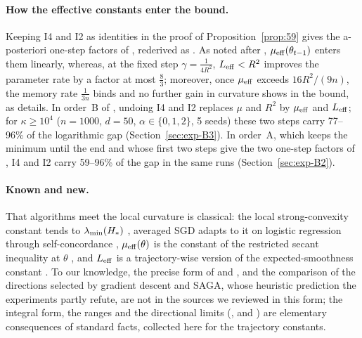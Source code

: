 \paragraph{How the effective constants enter the bound.}
Keeping I4 and I2 as identities in the proof of Proposition~\ref{prop:59} gives the a-posteriori one-step factors of
, rederived as . As noted after ,
$\mu_{\mathrm{eff}}(\theta_{t-1})$ enters them linearly, whereas, at the fixed step $\gamma=\frac1{4R^2}$, $L_{\mathrm{eff}}<R^2$ improves the
parameter rate by a factor at most $\frac83$; moreover, once $\mu_{\mathrm{eff}}$ exceeds $16R^2/(9n)$, the memory rate $\frac1{3n}$
binds and no further gain in curvature shows in the bound, as  details. In order~B of
, undoing I4 and I2 replaces $\mu$ and $R^2$ by $\mu_{\mathrm{eff}}$ and $L_{\mathrm{eff}}$; for $\kappa\ge10^4$
($n=1000$, $d=50$, $\alpha\in\{0,1,2\}$, 5 seeds) these two steps carry 77--96\% of the logarithmic gap
(Section~\ref{sec:exp-B3}). In order~A, which keeps the minimum until the end and whose first two steps give the two
one-step factors of , I4 and I2 carry 59--96\% of the gap in the same runs
(Section~\ref{sec:exp-B2}).

\paragraph{Known and new.}
That algorithms meet the local curvature is classical: the local strong-convexity constant tends to $\lambda_{\min}(H_\ast)$
\cite[Section~5.2.3]{bach2024learning}, averaged SGD adapts to it on logistic regression \cite{bach2014adaptivity} through
self-concordance \cite{bach2010self}, $\mu_{\mathrm{eff}}(\theta)$ is the constant of the restricted secant inequality at $\theta$
\cite{zhang2013gradient}, and $L_{\mathrm{eff}}$ is a trajectory-wise version of the expected-smoothness constant
\cite{gower2019sgd,gower2021stochastic}. To our knowledge, the precise form of  and
, and the comparison of the directions selected by gradient descent and SAGA, whose heuristic
prediction the experiments partly refute, are not in the sources we reviewed in this form; the integral form, the ranges
and the directional limits (,  and ) are elementary
consequences of standard facts, collected here for the trajectory constants.
